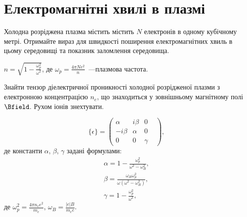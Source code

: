 \section{Електромагнітні хвилі в плазмі}

\begin{problem}
Холодна розріджена плазма містить містить $N$ електронів в одному кубічному метрі. Отримайте вираз для швидкості поширення електромагнітних хвиль в цьому середовищі та показник заломлення середовища.
\begin{solution}
	$n = \sqrt{1 - \frac{\omega_p^2}{\omega^2}}$, де $\omega_p = \frac{4\pi N e^2}{n}$~---плазмова частота.
\end{solution}
\end{problem}


\begin{problem}\label{prb:plasma}
Знайти тензор діелектричної проникності холодної розрідженої плазми з електронною концентрацією  $n_e$, що знаходиться у зовнішньому магнітному полі $\Bfield$. Рухом іонів знехтувати.
\begin{solution}
	\begin{equation*}
		\{ \epsilon \}  = \left( {\begin{array}{*{20}{c}}
				\alpha       & {i\beta } & 0      & \\
				{ - i\beta } & \alpha    & 0      & \\
				0            & 0         & \gamma &
			\end{array}} \right),
	\end{equation*}
	де константи $\alpha$, $\beta$, $\gamma$ задані формулами:
	\begin{align*}
		\alpha =  1 - \frac{\omega_p^2}{\omega ^2 - \omega _B^2},           \\
		\beta = \frac{\omega_B\omega_p^2}{\omega(\omega ^2 - \omega _B^2)}, \\
		\gamma = 1 - \frac{\omega _p^2}{\omega ^2},
	\end{align*}
	де $\omega _p^2 = \frac{4\pi n_e e^2}{m_e}$, $\omega_B = \frac{\left| e \right|B}{m_ec}$.
\end{solution}
\end{problem}

